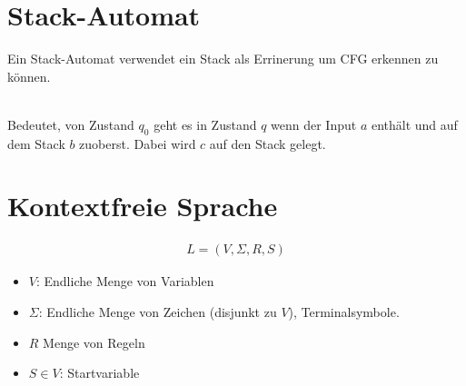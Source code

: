 \section*{Stack-Automat}
Ein Stack-Automat verwendet ein Stack als Errinerung um CFG erkennen zu können.\\
\\
Bedeutet, von Zustand \(q_0\) geht es in Zustand \(q\) wenn der Input \(a\) enthält und auf dem Stack \(b\) zuoberst. Dabei wird \(c\) auf den Stack gelegt.
\section*{Kontextfreie Sprache}
\begin{align*}
    L = (V, \Sigma, R, S)
\end{align*}
\begin{itemize}
    \item \(V\): Endliche Menge von Variablen
    \item \(\Sigma\): Endliche Menge von Zeichen (disjunkt zu \(V\)), Terminalsymbole.
    \item \(R\) Menge von Regeln
    \item \(S \in V\): Startvariable
\end{itemize}
